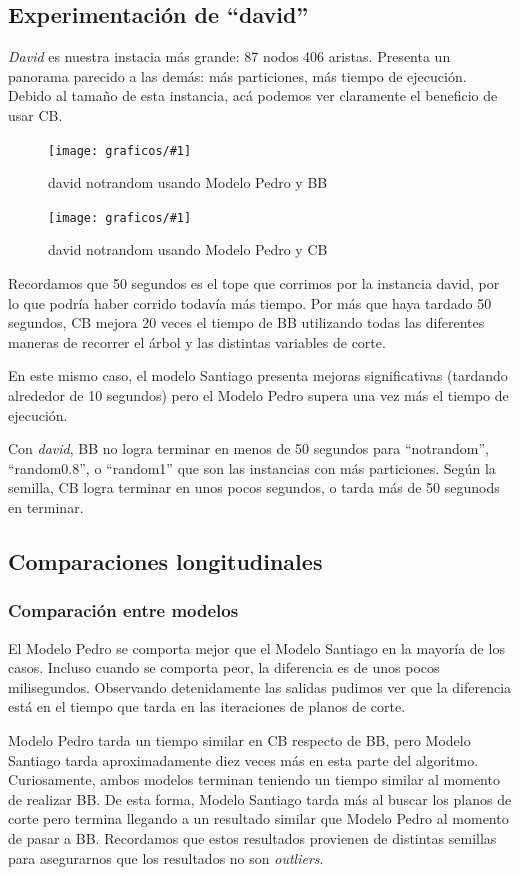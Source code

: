 \documentclass[a4paper, 10pt, twoside]{article}
\newcommand{\diagramavfig}[2]{%
  \begin{figure}[H]
    \texttt{[image: graficos/\#1]}%
    \caption{#2}
    \label{fig:#1}
  \end{figure}
}
\begin{document}
\subsection{Experimentación de ``david''}

\textit{David} es nuestra instacia más grande: 87 nodos 406 aristas. Presenta un panorama parecido a las demás: más particiones, más tiempo de ejecución. Debido al tamaño de esta instancia, acá podemos ver claramente el beneficio de usar CB.

\diagramavfig{david_notrandom_1_bb_0_segunJuntada}{david notrandom usando Modelo Pedro y BB}
\diagramavfig{david_notrandom_1_cb_0_segunJuntada}{david notrandom usando Modelo Pedro y CB}

Recordamos que 50 segundos es el tope que corrimos por la instancia david, por lo que podría haber corrido todavía más tiempo. Por más que haya tardado 50 segundos, CB mejora 20 veces el tiempo de BB utilizando todas las diferentes maneras de recorrer el árbol y las distintas variables de corte.

En este mismo caso, el modelo Santiago presenta mejoras significativas (tardando alrededor de 10 segundos) pero el Modelo Pedro supera una vez más el tiempo de ejecución.

Con \emph{david}, BB no logra terminar en menos de 50 segundos para ``notrandom'', ``random0.8'', o ``random1'' que son las instancias con más particiones. Según la semilla, CB logra terminar en unos pocos segundos, o tarda más de 50 segunods en terminar.

\subsection{Comparaciones longitudinales}

\subsubsection{Comparación entre modelos}

El Modelo Pedro se comporta mejor que el Modelo Santiago en la mayoría de los casos. Incluso cuando se comporta peor, la diferencia es de unos pocos milisegundos. Observando detenidamente las salidas pudimos ver que la diferencia está en el tiempo que tarda en las iteraciones de planos de corte.

Modelo Pedro tarda un tiempo similar en CB respecto de BB, pero Modelo Santiago tarda aproximadamente diez veces más en esta parte del algoritmo. Curiosamente, ambos modelos terminan teniendo un tiempo similar al momento de realizar BB. De esta forma, Modelo Santiago tarda más al buscar los planos de corte pero termina llegando a un resultado similar que Modelo Pedro al momento de pasar a BB. Recordamos que estos resultados provienen de distintas semillas para asegurarnos que los resultados no son \textit{outliers}.
\end{document}
